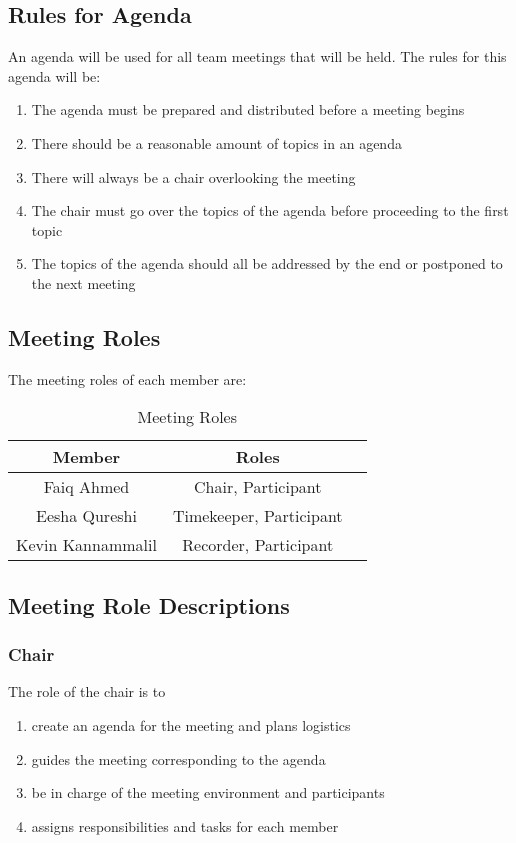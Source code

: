 \documentclass[12pt,letterpaper]{article}
\begin{document}
\subsection{Rules for Agenda}

An agenda will be used for all team meetings that will be held. The rules for this agenda will be: 

\begin{enumerate}
    \item The agenda must be prepared and distributed before a meeting begins
    \item There should be a reasonable amount of topics in an agenda 
    \item There will always be a chair overlooking the meeting
    \item The chair must go over the topics of the agenda before proceeding to the first topic
    \item The topics of the agenda should all be addressed by the end or postponed to the next meeting 
\end{enumerate}

\subsection{Meeting Roles}

The meeting roles of each member are: 

\begin{table}[H]
    \centering
    \begin{tabular}{ |c|c|c| } 
    \hline
    Member & Roles \\
    \hline
    Faiq Ahmed & Chair, Participant\\
    Eesha Qureshi & Timekeeper, Participant \\
    Kevin Kannammalil & Recorder, Participant \\
    \hline
    \end{tabular}
    \caption{Meeting Roles}
    \label{tab:meetingroles}
\end{table}

\subsection{Meeting Role Descriptions}

\subsubsection{Chair}
The role of the chair is to
\begin{enumerate}
    \item create an agenda for the meeting and plans logistics
    \item guides the meeting corresponding to the agenda
    \item be in charge of the meeting environment and participants
    \item assigns responsibilities and tasks for each member
\end{enumerate}
\end{document}
